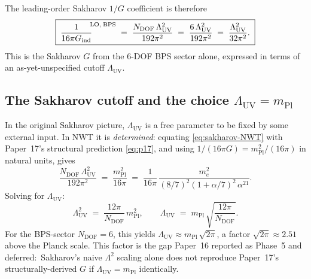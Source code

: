 \documentclass[11pt]{article}
\newcommand{\mPl}{m_{\mathrm{Pl}}}
\newcommand{\me}{m_e}
\begin{document}
The leading-order Sakharov $1/G$ coefficient is therefore
\begin{equation}
  \boxed{\;
    \frac{1}{16\pi G_{\mathrm{ind}}}^{\!\!\text{LO,\;BPS}}
     \;=\;
     \frac{N_{\mathrm{DOF}}\,\Lambda_{\mathrm{UV}}^2}{192\pi^2}
     \;=\;
     \frac{6\,\Lambda_{\mathrm{UV}}^2}{192\pi^2}
     \;=\;
     \frac{\Lambda_{\mathrm{UV}}^2}{32\pi^2}.
  \;}
  \label{eq:sakharov-NWT}
\end{equation}
This is the Sakharov $G$ from the $6$-DOF BPS sector alone,
expressed in terms of an as-yet-unspecified cutoff
$\Lambda_{\mathrm{UV}}$.

\subsection{The Sakharov cutoff and the choice
$\Lambda_{\mathrm{UV}} = \mPl$}

In the original Sakharov picture, $\Lambda_{\mathrm{UV}}$ is a
free parameter to be fixed by some external input.  In NWT it is
\emph{determined}: equating \eqref{eq:sakharov-NWT} with Paper~17's
structural prediction \eqref{eq:p17}, and using
$1/(16\pi G) = \mPl^2/(16\pi)$ in natural units, gives
\begin{equation}
  \frac{N_{\mathrm{DOF}}\,\Lambda_{\mathrm{UV}}^2}{192\pi^2}
   \;=\;
   \frac{\mPl^2}{16\pi}
   \;=\;
   \frac{1}{16\pi}\,
       \frac{\me^2}{(8/7)^2 (1 + \alpha/7)^2\,\alpha^{21}}.
  \label{eq:cutoff-equation}
\end{equation}
Solving for $\Lambda_{\mathrm{UV}}$:
\begin{equation}
  \Lambda_{\mathrm{UV}}^2
   \;=\;
   \frac{12\pi}{N_{\mathrm{DOF}}}\,\mPl^2,
  \qquad
  \Lambda_{\mathrm{UV}}
   \;=\;
   \mPl\,\sqrt{\frac{12\pi}{N_{\mathrm{DOF}}}}.
  \label{eq:cutoff-solved}
\end{equation}
For the BPS-sector $N_{\mathrm{DOF}} = 6$, this yields
$\Lambda_{\mathrm{UV}} \approx \mPl\,\sqrt{2\pi}$, a factor
$\sqrt{2\pi} \approx 2.51$ above the Planck scale.  This factor is
the gap Paper~16 reported as Phase~5 and deferred:\ Sakharov's naive
$\Lambda^2$ scaling alone does not reproduce Paper~17's
structurally-derived $G$ if $\Lambda_{\mathrm{UV}} = \mPl$
identically.
\end{document}
